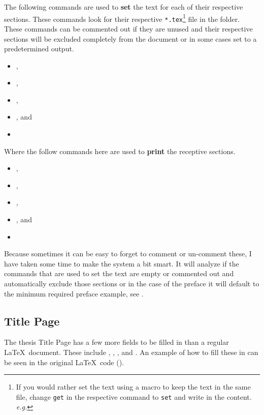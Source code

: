 		The following commands are used to \textbf{set} the text for each of their respective sections.
		These commands look for their respective \texttt{*.tex}\footnote{If you would rather set the text using a macro to keep the text in the same file, change \texttt{get} in the respective command to \texttt{set} and write in the content. \textit{e.g.} } file in the  folder.
		These commands can be commented out if they are unused and their respective sections will be excluded completely from the document or in some cases set to a predetermined output.
		\begin{itemize}
			\item {}\mopt{}, 
			\item {}\mopt{}, 
			\item {}\mopt{}, 
			\item {}\mopt{}, and 
			\item {}\mopt{}
		\end{itemize}

		Where the follow commands here are used to \textbf{print} the receptive sections.
		\begin{itemize}
			\item {}, 
			\item {}, 
			\item {}, 
			\item {}, and 
			\item {} 
		\end{itemize}
		Because sometimes it can be easy to forget to comment or un-comment these, I have taken some time to make the system a bit smart.
		It will analyze if the commands that are used to set the text are empty or commented out and automatically exclude those sections or in the case of the preface it will default to the minimum required preface example, see .

		\subsection{Title Page}
			The thesis Title Page has a few more fields to be filled in than a regular \LaTeX\ document.
			These include , , , and .
			An example of how to fill these in can be seen in the original \LaTeX\ code ().

